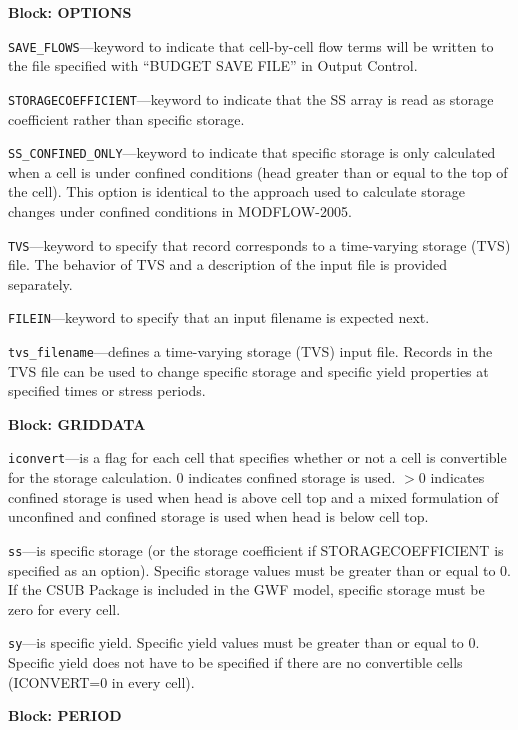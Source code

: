 
\item \textbf{Block: OPTIONS}

\begin{description}
\item \texttt{SAVE\_FLOWS}---keyword to indicate that cell-by-cell flow terms will be written to the file specified with ``BUDGET SAVE FILE'' in Output Control.

\item \texttt{STORAGECOEFFICIENT}---keyword to indicate that the SS array is read as storage coefficient rather than specific storage.

\item \texttt{SS\_CONFINED\_ONLY}---keyword to indicate that specific storage is only calculated when a cell is under confined conditions (head greater than or equal to the top of the cell). This option is identical to the approach used to calculate storage changes under confined conditions in MODFLOW-2005.

\item \texttt{TVS}---keyword to specify that record corresponds to a time-varying storage (TVS) file.  The behavior of TVS and a description of the input file is provided separately.

\item \texttt{FILEIN}---keyword to specify that an input filename is expected next.

\item \texttt{tvs\_filename}---defines a time-varying storage (TVS) input file.  Records in the TVS file can be used to change specific storage and specific yield properties at specified times or stress periods.

\end{description}
\item \textbf{Block: GRIDDATA}

\begin{description}
\item \texttt{iconvert}---is a flag for each cell that specifies whether or not a cell is convertible for the storage calculation. 0 indicates confined storage is used. $>$0 indicates confined storage is used when head is above cell top and a mixed formulation of unconfined and confined storage is used when head is below cell top.

\item \texttt{ss}---is specific storage (or the storage coefficient if STORAGECOEFFICIENT is specified as an option). Specific storage values must be greater than or equal to 0. If the CSUB Package is included in the GWF model, specific storage must be zero for every cell.

\item \texttt{sy}---is specific yield. Specific yield values must be greater than or equal to 0. Specific yield does not have to be specified if there are no convertible cells (ICONVERT=0 in every cell).

\end{description}
\item \textbf{Block: PERIOD}


